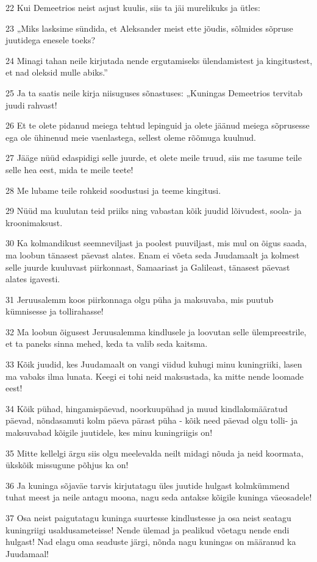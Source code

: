 \par 22 Kui Demeetrios neist asjust kuulis, siis ta jäi murelikuks ja ütles:
\par 23 „Miks lasksime sündida, et Aleksander meist ette jõudis, sõlmides sõpruse juutidega enesele toeks?
\par 24 Minagi tahan neile kirjutada nende ergutamiseks ülendamistest ja kingitustest, et nad oleksid mulle abiks.”
\par 25 Ja ta saatis neile kirja niisuguses sõnastuses: „Kuningas Demeetrios tervitab juudi rahvast!
\par 26 Et te olete pidanud meiega tehtud lepinguid ja olete jäänud meiega sõprusesse ega ole ühinenud meie vaenlastega, sellest oleme rõõmuga kuulnud.
\par 27 Jääge nüüd edaspidigi selle juurde, et olete meile truud, siis me tasume teile selle hea eest, mida te meile teete!
\par 28 Me lubame teile rohkeid soodustusi ja teeme kingitusi.
\par 29 Nüüd ma kuulutan teid priiks ning vabastan kõik juudid lõivudest, soola- ja kroonimaksust.
\par 30 Ka kolmandikust seemneviljast ja poolest puuviljast, mis mul on õigus saada, ma loobun tänasest päevast alates. Enam ei võeta seda Juudamaalt ja kolmest selle juurde kuuluvast piirkonnast, Samaariast ja Galileast, tänasest päevast alates igavesti.
\par 31 Jeruusalemm koos piirkonnaga olgu püha ja maksuvaba, mis puutub kümnisesse ja tollirahasse!
\par 32 Ma loobun õigusest Jeruusalemma kindlusele ja loovutan selle ülempreestrile, et ta paneks sinna mehed, keda ta valib seda kaitsma.
\par 33 Kõik juudid, kes Juudamaalt on vangi viidud kuhugi minu kuningriiki, lasen ma vabaks ilma lunata. Keegi ei tohi neid maksustada, ka mitte nende loomade eest!
\par 34 Kõik pühad, hingamispäevad, noorkuupühad ja muud kindlaksmääratud päevad, nõndasamuti kolm päeva pärast püha - kõik need päevad olgu tolli- ja maksuvabad kõigile juutidele, kes minu kuningriigis on!
\par 35 Mitte kellelgi ärgu siis olgu meelevalda neilt midagi nõuda ja neid koormata, ükskõik missugune põhjus ka on!
\par 36 Ja kuninga sõjaväe tarvis kirjutatagu üles juutide hulgast kolmkümmend tuhat meest ja neile antagu moona, nagu seda antakse kõigile kuninga väeosadele!
\par 37 Osa neist paigutatagu kuninga suurtesse kindlustesse ja osa neist seatagu kuningriigi usaldusameteisse! Nende ülemad ja pealikud võetagu nende endi hulgast! Nad elagu oma seaduste järgi, nõnda nagu kuningas on määranud ka Juudamaal!
